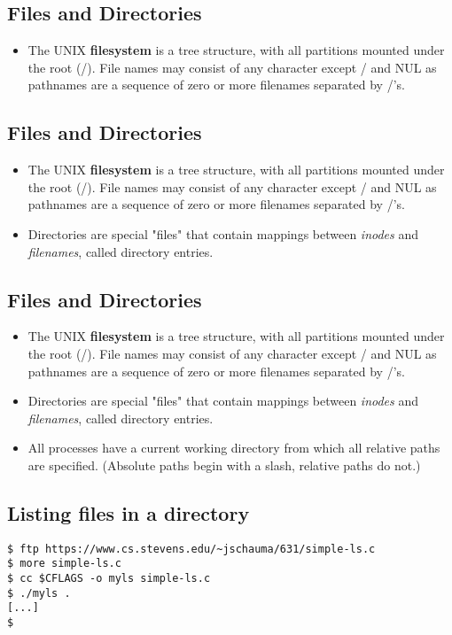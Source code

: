 \documentclass[sxga]{xdvislides}
\begin{document}
\subsection{Files and Directories}
\begin{itemize}
	\item The UNIX {\bf filesystem} is a tree structure, with all partitions
		mounted under the root (/). File names may consist of any
		character except / and NUL as pathnames are a sequence of
		zero or more filenames separated by /'s.
\end{itemize}

\subsection{Files and Directories}
\begin{itemize}
	\item The UNIX {\bf filesystem} is a tree structure, with all partitions
		mounted under the root (/). File names may consist of any
		character except / and NUL as pathnames are a sequence of
		zero or more filenames separated by /'s.
	\item Directories are special "files" that contain mappings
		between {\em inodes} and {\em filenames}, called directory
		entries.
\end{itemize}


\subsection{Files and Directories}
\begin{itemize}
	\item The UNIX {\bf filesystem} is a tree structure, with all partitions
		mounted under the root (/). File names may consist of any
		character except / and NUL as pathnames are a sequence of
		zero or more filenames separated by /'s.
	\item Directories are special "files" that contain mappings
		between {\em inodes} and {\em filenames}, called directory
		entries.
	\item All processes have a current working directory from which
		all relative paths are specified. (Absolute paths begin
		with a slash, relative paths do not.)
\end{itemize}

\subsection{Listing files in a directory}
\vspace*{\fill}
\begin{verbatim}
$ ftp https://www.cs.stevens.edu/~jschauma/631/simple-ls.c
$ more simple-ls.c
$ cc $CFLAGS -o myls simple-ls.c
$ ./myls .
[...]
$
\end{verbatim}
\vspace*{\fill}
\end{document}
